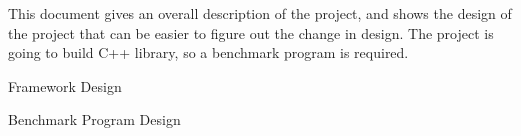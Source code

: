 This document gives an overall description of the project, and shows the design of the project that can be easier to figure out the change in design. The project is going to build C++ library, so a benchmark program is required.
\begin{DoxyItemize}
\item Framework Design
\item Benchmark Program Design 
\end{DoxyItemize}